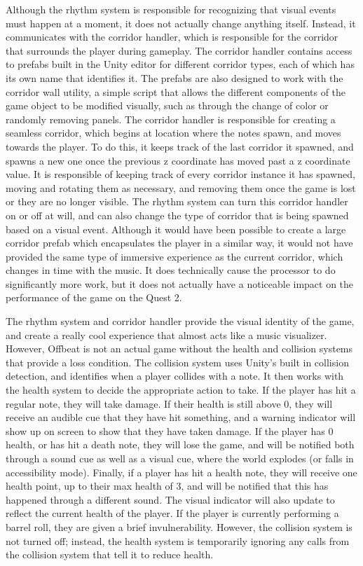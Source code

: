 \documentclass[10pt,twocolumn]{article}
\begin{document}
Although the rhythm system is responsible for recognizing that visual events must happen at a moment, it does not actually change anything itself. Instead, it communicates with the corridor handler, which is responsible for the corridor that surrounds the player during gameplay. The corridor handler contains access to prefabs built in the Unity editor for different corridor types, each of which has its own name that identifies it. The prefabs are also designed to work with the corridor wall utility, a simple script that allows the different components of the game object to be modified visually, such as through the change of color or randomly removing panels. The corridor handler is responsible for creating a seamless corridor, which begins at location where the notes spawn, and moves towards the player. To do this, it keeps track of the last corridor it spawned, and spawns a new one once the previous z coordinate has moved past a z coordinate value. It is responsible of keeping track of every corridor instance it has spawned, moving and rotating them as necessary, and removing them once the game is lost or they are no longer visible. The rhythm system can turn this corridor handler on or off at will, and can also change the type of corridor that is being spawned based on a visual event. Although it would have been possible to create a large corridor prefab which encapsulates the player in a similar way, it would not have provided the same type of immersive experience as the current corridor, which changes in time with the music. It does technically cause the processor to do significantly more work, but it does not actually have a noticeable impact on the performance of the game on the Quest 2.

The rhythm system and corridor handler provide the visual identity of the game, and create a really cool experience that almost acts like a music visualizer. However, Offbeat is not an actual game without the health and collision systems that provide a loss condition. The collision system uses Unity's built in collision detection, and identifies when a player collides with a note. It then works with the health system to decide the appropriate action to take. If the player has hit a regular note, they will take damage. If their health is still above 0, they will receive an audible cue that they have hit something, and a warning indicator will show up on screen to show that they have taken damage. If the player has 0 health, or has hit a death note, they will lose the game, and will be notified both through a sound cue as well as a visual cue, where the world explodes (or falls in accessibility mode). Finally, if a player has hit a health note, they will receive one health point, up to their max health of 3, and will be notified that this has happened through a different sound. The visual indicator will also update to reflect the current health of the player. If the player is currently performing a barrel roll, they are given a brief invulnerability. However, the collision system is not turned off; instead, the health system is temporarily ignoring any calls from the collision system that tell it to reduce health.
\end{document}
